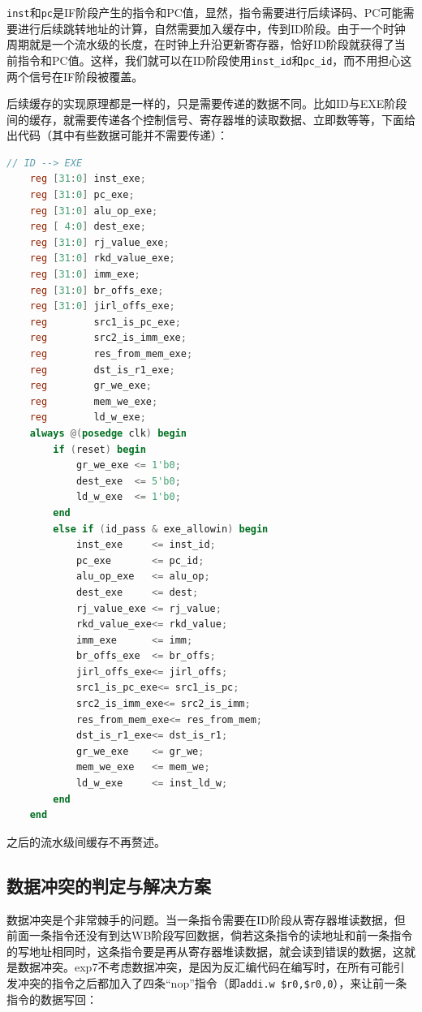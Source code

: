 \documentclass[UTF8]{report}
\begin{document}
\texttt{inst}和\texttt{pc}是IF阶段产生的指令和PC值，显然，指令需要进行后续译码、PC可能需要进行后续跳转地址的计算，自然需要加入缓存中，传到ID阶段。由于一个时钟周期就是一个流水级的长度，在时钟上升沿更新寄存器，恰好ID阶段就获得了当前指令和PC值。这样，我们就可以在ID阶段使用\texttt{inst\_id}和\texttt{pc\_id}，而不用担心这两个信号在IF阶段被覆盖。

后续缓存的实现原理都是一样的，只是需要传递的数据不同。比如ID与EXE阶段间的缓存，就需要传递各个控制信号、寄存器堆的读取数据、立即数等等，下面给出代码（其中有些数据可能并不需要传递）：

\begin{lstlisting}[language=Verilog]
    // ID --> EXE
    reg [31:0] inst_exe;
    reg [31:0] pc_exe;
    reg [31:0] alu_op_exe;
    reg [ 4:0] dest_exe;
    reg [31:0] rj_value_exe;
    reg [31:0] rkd_value_exe;
    reg [31:0] imm_exe;
    reg [31:0] br_offs_exe;
    reg [31:0] jirl_offs_exe;
    reg        src1_is_pc_exe;
    reg        src2_is_imm_exe;
    reg        res_from_mem_exe;
    reg        dst_is_r1_exe;
    reg        gr_we_exe;
    reg        mem_we_exe;
    reg        ld_w_exe;
    always @(posedge clk) begin
        if (reset) begin
            gr_we_exe <= 1'b0;
            dest_exe  <= 5'b0;
            ld_w_exe  <= 1'b0;
        end
        else if (id_pass & exe_allowin) begin
            inst_exe     <= inst_id;
            pc_exe       <= pc_id;
            alu_op_exe   <= alu_op;
            dest_exe     <= dest;
            rj_value_exe <= rj_value;
            rkd_value_exe<= rkd_value;
            imm_exe      <= imm;
            br_offs_exe  <= br_offs;
            jirl_offs_exe<= jirl_offs;
            src1_is_pc_exe<= src1_is_pc;
            src2_is_imm_exe<= src2_is_imm;
            res_from_mem_exe<= res_from_mem;
            dst_is_r1_exe<= dst_is_r1;
            gr_we_exe    <= gr_we;
            mem_we_exe   <= mem_we;
            ld_w_exe     <= inst_ld_w;
        end
    end
\end{lstlisting}

之后的流水级间缓存不再赘述。

\subsection{数据冲突的判定与解决方案}

数据冲突是个非常棘手的问题。当一条指令需要在ID阶段从寄存器堆读数据，但前面一条指令还没有到达WB阶段写回数据，倘若这条指令的读地址和前一条指令的写地址相同时，这条指令要是再从寄存器堆读数据，就会读到错误的数据，这就是数据冲突。exp7不考虑数据冲突，是因为反汇编代码在编写时，在所有可能引发冲突的指令之后都加入了四条“nop”指令（即\texttt{addi.w	\$r0,\$r0,0}），来让前一条指令的数据写回：
\end{document}
